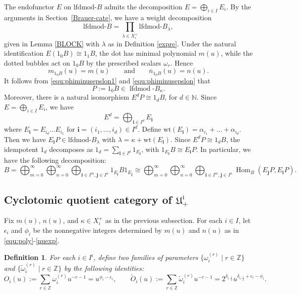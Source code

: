 \documentclass[a4,10pt]{amsart}
\numberwithin{equation}{section}
\def\Hom{\operatorname{Hom}}
\newtheorem{Defn}[Theorem]{Definition}
\theoremstyle{definition}
\begin{document}
The endofunctor $E$ on $\text{lfdmod-}B$ admits the  decomposition $E=\bigoplus_{i\in I}E_i$. By  the arguments in Section~\ref{Brauer-cate},  we have a weight decomposition 
\[ \text{lfdmod-}B= \prod_{\lambda\in {X_\imath^+}} \text{lfdmod-}B_\lambda,\]
 given in Lemma \ref{BLOCK} with $\lambda$ as in Definition \ref{expre}. 
Under the natural identification \(E(1_0B)\cong 1_1B\), the dot
has minimal polynomial \(m(u)\), while the dotted bubbles act on
\(1_0B\) by the prescribed scalars \(\omega_r\). Hence
\[
m_{1_0B}(u)=m(u)
\qquad\text{and}\qquad
\overline{n}_{1_0B}(u)=n(u).
\]
It follows from \eqref{equ:phiminusepslon1} and  \eqref{equ:phiminusepslon} that
\begin{equation}\label{objP}
P:=1_0B\in \operatorname{lfdmod}\text{-}B_\kappa.
\end{equation}
Moreover, there is a  natural isomorphism   
$E^dP\cong1_d B$, for $d\in\mathbb N$. Since $E=\bigoplus_{i\in I}E_i$, we have 
\[ E^d=\bigoplus_{\mathbf i\in I^d} E_{\mathbf i}\]
where $E_{\mathbf i}=E_{i_d}\ldots E_{i_1}$ for $\mathbf i=(i_1,\ldots,i_d)\in I^d$.
Define $\text{wt}(E_\mathbf i)=\alpha_{i_1}+\ldots+\alpha_{i_d}$. 
Then we have $E_{\mathbf i}P\in \text{lfdmod-}B_\lambda $ with $\lambda=\kappa+ \text{wt}(E_\mathbf i)$. 
Since $E^dP\cong 1_d B$, the idempotent $1_d$ decomposes as $1_d=\sum_{\mathbf i\in I^d} 1_{E_{\mathbf i}}$, with  
$1_{E_{\mathbf i}}B\cong E_{\mathbf i} P $.
In particular, we have the following  decomposition: %
\begin{equation}
\label{equ:decomofB}
B=\bigoplus_{m=0}^\infty \bigoplus_{n=0}^\infty\bigoplus_{\mathbf i\in I^m,\mathbf j\in I^n} 1_{E_\mathbf i} B1_{E_{\mathbf j}}\cong\bigoplus_{m=0}^\infty \bigoplus_{n=0}^\infty \bigoplus_{ \mathbf i\in I^m,\mathbf j\in I^n}\Hom_{B}(E_{\mathbf j}P, E_{\mathbf i}P).
\end{equation}


\subsection{Cyclotomic quotient category of $\mathfrak U^\imath_+$}
Fix $m(u)$, $n(u)$, and $\kappa\in X^+_\imath$ as in the previous subsection.
For each $i\in I$, let $\epsilon_i$ and $\phi_i$ be the nonnegative integers
determined by $m(u)$ and $n(u)$ as  in \eqref{equ:poly}-\eqref{nuexp}.

\begin{Defn}\label{844}
For each $i\in I^\imath$, define two families of parameters
\(\{\omega_i^{(r)} \mid r\in \mathbb Z\}\) and
\(\{\tilde{\omega}_i^{(r)} \mid r\in \mathbb Z\}\) by the following identities:
\begin{equation}\label{localpara}
O_i(u) := \sum_{r\in \mathbb Z} \omega_i^{(r)} u^{-r-1}
= u^{\phi_i-\epsilon_i},
\qquad
\tilde O_i(u) := \sum_{r\in \mathbb Z} \tilde\omega_i^{(r)} u^{-r-1}
=
2^{\delta_{i,\frac12}}
u^{\delta_{i,\frac12}+\epsilon_i-\phi_i}.
\end{equation}
\end{Defn}
\end{document}
